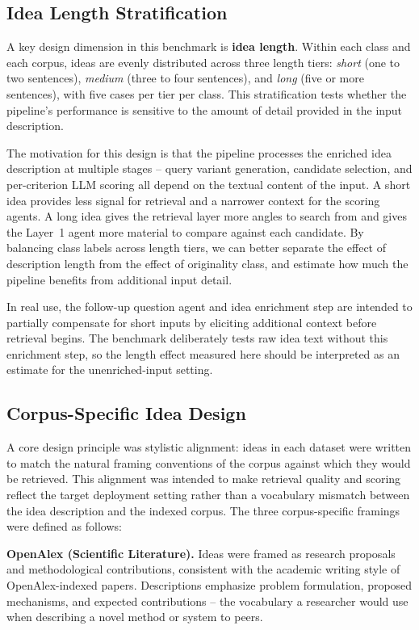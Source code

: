 \subsection{Idea Length Stratification}
 
A key design dimension in this benchmark is \textbf{idea length}. Within each class and each corpus, ideas are evenly distributed across three length tiers: \textit{short} (one to two sentences), \textit{medium} (three to four sentences), and \textit{long} (five or more sentences), with five cases per tier per class. This stratification tests whether the pipeline's performance is sensitive to the amount of detail provided in the input description.
 
The motivation for this design is that the pipeline processes the enriched idea description at multiple stages -- query variant generation, candidate selection, and per-criterion LLM scoring all depend on the textual content of the input. A short idea provides less signal for retrieval and a narrower context for the scoring agents. A long idea gives the retrieval layer more angles to search from and gives the Layer~1 agent more material to compare against each candidate. By balancing class labels across length tiers, we can better separate the effect of description length from the effect of originality class, and estimate how much the pipeline benefits from additional input detail.
 
In real use, the follow-up question agent and idea enrichment step are intended to partially compensate for short inputs by eliciting additional context before retrieval begins. The benchmark deliberately tests raw idea text without this enrichment step, so the length effect measured here should be interpreted as an estimate for the unenriched-input setting.
 
\subsection{Corpus-Specific Idea Design}
 
A core design principle was stylistic alignment: ideas in each dataset were written to match the natural framing conventions of the corpus against which they would be retrieved. This alignment was intended to make retrieval quality and scoring reflect the target deployment setting rather than a vocabulary mismatch between the idea description and the indexed corpus. The three corpus-specific framings were defined as follows:
 
\textbf{OpenAlex (Scientific Literature).} Ideas were framed as research proposals and methodological contributions, consistent with the academic writing style of OpenAlex-indexed papers. Descriptions emphasize problem formulation, proposed mechanisms, and expected contributions -- the vocabulary a researcher would use when describing a novel method or system to peers.
 
